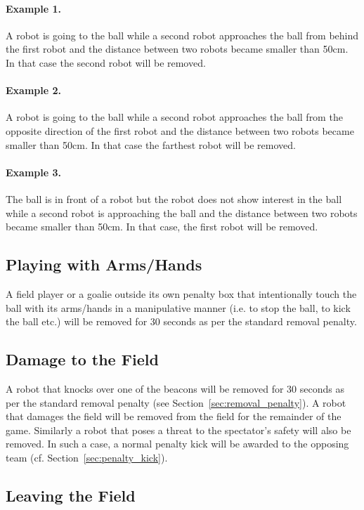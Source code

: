 \documentclass[12pt]{article}
\newcommand{\cf}{\mbox{cf.}\xspace}
\begin{document}
\paragraph{Example 1.} A robot is going to the ball while a second robot approaches the ball from behind the first robot and the distance between two robots became smaller than 50cm. In that case the second robot will be removed. 

\paragraph{Example 2.} A robot is going to the ball while a second robot approaches the ball from the opposite direction of the first robot and the distance between two robots became smaller than 50cm. In that case the farthest robot will be removed. 

\paragraph{Example 3.} The ball is in front of a robot but the robot does not show interest in the ball while a second robot is approaching the ball and the distance between two robots became smaller than 50cm. In that case, the first robot will be removed.

\subsection{Playing with Arms/Hands}
A field player or a goalie outside its own penalty box that intentionally touch the ball with its arms/hands in a manipulative manner (i.e. to stop the ball, to kick the ball etc.) will be removed for 30 seconds as per the standard removal penalty. 

\subsection{Damage to the Field}

A robot that knocks over one of the beacons will be removed for 30
seconds as per the standard removal penalty (see
Section~\ref{sec:removal_penalty}). A robot that damages the field
will be removed from the field for the remainder
of the game. Similarly a robot that poses a threat to the
spectator's safety will also be removed. In such a case, a normal
penalty kick will be awarded to the opposing team (\cf
Section~\ref{sec:penalty_kick}).

\subsection{Leaving the Field}
\end{document}
